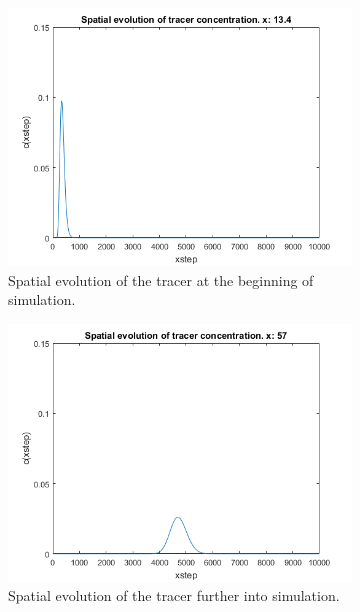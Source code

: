 \documentclass[12pt]{article}
\begin{document}
\begin{figure}[H]
	\centering
	\begin{subfigure}[b]{0.8\textwidth}   
		\centering 
		\includegraphics[width=\textwidth]{spatial1}
		{{\small Spatial evolution of the tracer at the beginning of simulation.}}    
	\end{subfigure}
	\begin{subfigure}[b]{0.8\textwidth}   
		\centering 
		\includegraphics[width=\textwidth]{spatial2}
		{{\small Spatial evolution of the tracer further into simulation.}}    
	\end{subfigure}
\end{figure}
\end{document}
